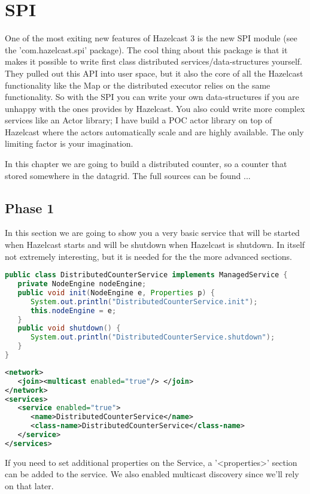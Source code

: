 \chapter{SPI}

One of the most exiting new features of Hazelcast 3 is the new SPI module (see the 'com.hazelcast.spi' package). The cool thing about this package is that it makes it possible to write first class distributed services/data-structures yourself. They pulled out this API into user space, but it also the core of all the Hazelcast functionality like the Map or the distributed executor relies on the same functionality. So with the SPI you can write your own data-structures if you are unhappy with the ones provides by Hazelcast. You also could write more complex services like an Actor library; I have build a POC actor library on top of Hazelcast where the actors automatically scale and are highly available. The only limiting factor is your imagination.

In this chapter we are going to build a distributed counter, so a counter that stored somewhere in the datagrid. The full sources can be found ...

\section{Phase 1}
In this section we are going to show you a very basic service that will be started when Hazelcast starts and will be shutdown when Hazelcast is shutdown. In itself not extremely interesting, but it is needed for the the more advanced sections.

\begin{lstlisting}[language=java]
public class DistributedCounterService implements ManagedService {
   private NodeEngine nodeEngine;
   public void init(NodeEngine e, Properties p) {
      System.out.println("DistributedCounterService.init");
      this.nodeEngine = e;
   }
   public void shutdown() {
      System.out.println("DistributedCounterService.shutdown");
   }
}
\end{lstlisting}

\begin{lstlisting}[language=xml]
<network>
   <join><multicast enabled="true"/> </join>
</network>
<services>
   <service enabled="true">
      <name>DistributedCounterService</name>
      <class-name>DistributedCounterService</class-name>
   </service>
</services>
\end{lstlisting}
If you need to set additional properties on the Service, a '<properties>' section can be added to the service. We also enabled multicast discovery since we'll rely on that later.

